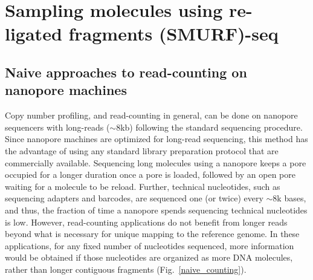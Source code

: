 \chapter{Sampling molecules using re-ligated fragments (SMURF)-seq}
\label{ch3}


\section{Naive approaches to read-counting on nanopore machines}
Copy number profiling, and read-counting in general, can be done on
nanopore sequencers with long-reads ($\sim$8kb) following the standard
sequencing procedure.
Since nanopore machines are optimized for long-read sequencing, this
method has the advantage of using any standard library preparation
protocol that are commercially available.  Sequencing long
molecules using a nanopore keeps a pore occupied for a longer duration
once a pore is loaded, followed by an open pore waiting for a molecule to
be reload.  Further, technical nucleotides, such as sequencing adapters
and barcodes, are sequenced one (or twice) every $\sim$8k bases, and
thus, the fraction of time a nanopore spends sequencing technical
nucleotides is low.
However, read-counting applications do not benefit from longer reads
beyond what is necessary for unique mapping to the reference genome. In
these applications, for any fixed number of nucleotides sequenced, more
information would be obtained if those nucleotides are organized as more
DNA molecules, rather than longer contiguous fragments
(Fig.~\ref{naive_counting}).

